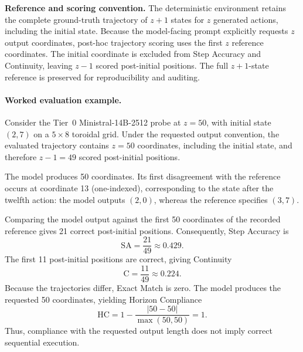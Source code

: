 \documentclass{article}
\begin{document}
\noindent\textbf{Reference and scoring convention.}
The deterministic environment retains the complete
ground-truth trajectory of $z+1$ states for $z$
generated actions, including the initial state.
Because the model-facing prompt explicitly requests
$z$ output coordinates, post-hoc trajectory scoring
uses the first $z$ reference coordinates.
The initial coordinate is excluded from Step Accuracy
and Continuity, leaving $z-1$ scored post-initial
positions. The full $z+1$-state reference is
preserved for reproducibility and auditing.

\paragraph{Worked evaluation example.}
Consider the Tier~0 Ministral-14B-2512 probe at
$z=50$, with initial state $(2,7)$ on a
$5\times 8$ toroidal grid. Under the requested
output convention, the evaluated trajectory
contains $z=50$ coordinates, including the
initial state, and therefore $z-1=49$ scored
post-initial positions.

The model produces 50 coordinates. Its first
disagreement with the reference occurs at
coordinate 13 (one-indexed), corresponding
to the state after the twelfth action:
the model outputs $(2,0)$, whereas the
reference specifies $(3,7)$.

Comparing the model output against the first
50 coordinates of the recorded reference
gives 21 correct post-initial positions.
Consequently, Step Accuracy is
\[
    \mathrm{SA}=\frac{21}{49}\approx 0.429.
\]
The first 11 post-initial positions are
correct, giving Continuity
\[
    \mathrm{C}=\frac{11}{49}\approx 0.224.
\]
Because the trajectories differ, Exact Match
is zero. The model produces the requested
50 coordinates, yielding Horizon Compliance
\[
    \mathrm{HC}
    =1-\frac{|50-50|}{\max(50,50)}
    =1.
\]
Thus, compliance with the requested output
length does not imply correct sequential
execution.
\end{document}
